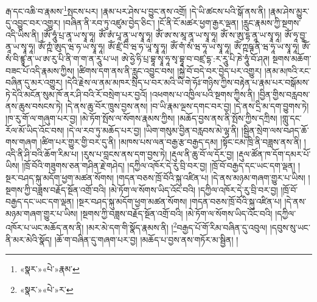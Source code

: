 རྒ་དང་འཆི་བ་རྣམས་\footnote{«སྣར་»«པེ་»རྣམ་}སྤངས་པར། །རྣམ་པར་ཤེས་པ་བྱུང་ནས་འགྲོ། །དེ་ཡི་ཚངས་པའི་སྒོ་ནས་ནི། །རྣམ་ཤེས་མྱུར་དུ་འབྱུང་བར་འགྱུར། །བཞིན་ནི་རབ་ཏུ་འཛུམ་བྱེད་ཅིང་། །ངོ་ནི་ངོ་མཚར་ཕྱག་རྒྱར་ལྡན། །རླུང་རྣམས་ཀྱི་སྔགས་འདི་ཡིས་ནི། །ཨོཾ་ཧཱུཾ་པྲ་ནཱ་ཡ་སྭཱ་ཧཱ། ཨོཾ་ཨཾ་པཱ་ནཱ་ཡ་སྭཱ་ཧཱ། ཨོཾ་ཨ་ས་མཱ་ནཱ་ཡ་སྭཱ་ཧཱ། ཨོཾ་ས་ཨུ་དྷ་ནཱ་ཡ་སྭཱ་ཧཱ། ཨོཾ་ཧཱ་བྱཱ་ནཱ་ཡ་སྭཱ་ཧཱ། ཨོཾ་ཀྵཾ་ཨུད་ཝ་ཧ་ཡ་སྭཱ་ཧཱ། ཨོཾ་ཛྲཾ་བི་ཝ་ཧ་ཡཱ་སྭཱ་ཧཱ། ཨོཾ་གཾ་སཾ་ཝ་ཧཱ་ཡ་སྭཱ་ཧཱ། ཨོཾ་ཀྵཥྚ་ནི་ཝ་ཧཱ་ཡ་སྭཱ་ཧཱ། ཨོཾ་སཾ་བི་ཛྙཱ་ན་ཡ་ཨ་རུ་པི་ནི་ག་ག་ན་རཱུ་པ་ཡ། ཨེ་ཧྱེ་ཧི་པྲ་བྷཱ་སྭཱ་ཧཱ་སྭ་བྷཱ་བ་བཛྲ་དྷ་:ར་རཱུ་པི་ཎེ་ཧཱུཾ་བོ་ཤཊ། སྔགས་མཆོག་བཟང་པོ་འདི་རྣམས་ཀྱིས། །ཚིགས་དག་ནས་ནི་རླུང་འབྱུང་བས། །སྐྱེ་བོ་བདེ་བར་བྱེད་པར་འགྱུར། །ནམ་མཁའི་རང་བཞིན་དུ་མར་འགྱུར། །དེའི་རྗེས་ལ་ནམ་མཁར་སྲིད་པ་བར་མའི་ཡི་གེ་ཧོཿ་གཉིས་ཀྱིས་བརྟེན་པ་རྣམ་པར་བསྒོམས་ཏེ་དེའི་མངོན་སུམ་ཁོ་ནར་ཤི་བའི་རོ་བསྲེག་པར་བྱའོ། །འཕགས་པ་འཁྱིལ་པའི་སྔགས་ཀྱིས་ནི། །བྱིན་གྱིས་བརླབས་ནས་ཆུས་བསངས་ཏེ། །དེ་ནས་ཆུ་བོར་ཁྲུས་བྱས་ནས། །བ་ཡི་རྣམ་ལྔས་དགང་བར་བྱ། །དེ་ནས་དྲི་མ་དག་བྱུགས་ཏེ། །ཁ་རུ་གོ་ལ་གཞུག་པར་བྱ། །མེ་ཏོག་སྤོས་ལ་སོགས་རྣམས་ཀྱིས། །མཆོད་བྱས་ནས་ནི་སྤོས་ཀྱིས་དཀྲིས། །གླུ་དང་རོལ་མོ་ཡིད་འོང་བས། །དེ་ལ་རབ་ཏུ་མཆོད་པར་བྱ། །ཡིག་གསུམ་བྱིན་བརླབས་མེ་ལྷ་ནི། །སྦྱིན་སྲེག་ལས་བཤད་ཆོ་གས་གཞག །ཚིག་པར་གྱུར་གྱི་བར་དུ་ནི། །མཁས་པས་ལན་བརྒྱ་རྩ་བརྒྱད་དམ། །སྟོང་ངམ་ཁྲི་ནི་བཟླས་ནས་ནི། །འདི་ནི་ཤི་བའི་ཆོག་རིམ་པ། །རུས་པ་བླངས་ནས་དག་བྱས་ཏེ། །རྡུལ་ནི་ཆུ་བོ་ལ་དོར་བྱ། །རྡུལ་ཚོན་ཁ་དོག་དམར་པོ་ཡིས། །ཁྲོ་བོའི་གཟུགས་ཅན་གཤིན་རྗེ་གཤེད། །དཀྱིལ་འཁོར་དེ་རུ་བྲི་བར་བྱ། །ཁྲོ་བོ་བརྒྱད་དང་ཡང་དག་ལྡན། །སྔར་བཤད་སྐུ་མདོག་ཕྱག་མཚན་སོགས། །གདན་བཅས་ཁྲོ་བོའི་སྐུ་འཛིན་པ། །དེ་ནས་མཉམ་གཞག་གྱུར་པ་ཡིས། །སྔགས་ཀྱི་བཟླས་བརྗོད་སྔོན་འགྲོ་བའི། །མེ་ཏོག་ལ་སོགས་ཡིད་འོང་བའི། །དཀྱིལ་འཁོར་དེ་རུ་བྲི་བར་བྱ། །ཁྲོ་བོ་བརྒྱད་དང་ཡང་དག་ལྡན། །སྔར་བཤད་སྐུ་མདོག་ཕྱག་མཚན་སོགས། །གདན་བཅས་ཁྲོ་བོའི་སྐུ་འཛིན་པ། །དེ་ནས་མཉམ་གཞག་གྱུར་པ་ཡིས། །སྔགས་ཀྱི་བཟླས་བརྗོད་སྔོན་འགྲོ་བའི། །མེ་ཏོག་ལ་སོགས་ཡིད་འོང་བའི། །དཀྱིལ་འཁོར་པ་ཡང་མཆོད་ནས་ནི། །མར་མེ་དག་གི་སྣོད་རྣམས་ནི། །\footnote{«སྣར་»«པེ་»ར་}བརྒྱད་པོ་གོ་རིམ་བཞིན་དུ་འབུལ། །དབུས་སུ་ཡང་ནི་མར་མེའི་སྣོད། །ཆོ་ག་བཞིན་དུ་གཞག་པར་བྱ། །མཆོད་པ་བྱས་ནས་གཏོར་མ་སྦྱིན། །
